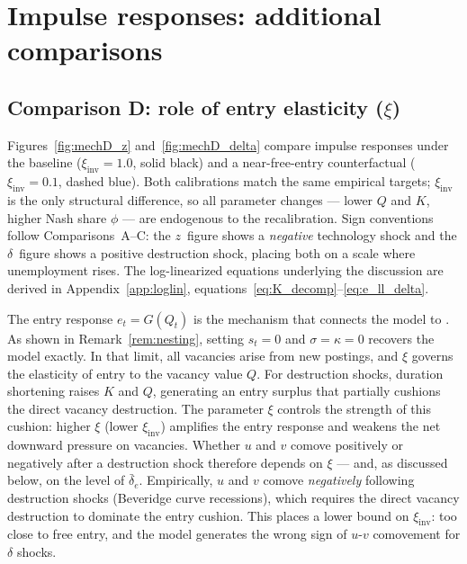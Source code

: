 \documentclass[authoryear, review, 12pt]{elsarticle}
\begin{document}
\section{Impulse responses: additional comparisons}
\label{app:additional_comparisons}

\subsection{Comparison D: role of entry elasticity ($\xi$)}
\label{app:comparison_D}

Figures~\ref{fig:mechD_z} and~\ref{fig:mechD_delta} compare impulse
responses under the baseline ($\xi_{\mathrm{inv}}=1.0$, solid black) and a
near-free-entry counterfactual ($\xi_{\mathrm{inv}}=0.1$, dashed blue).
Both calibrations match the same empirical targets; $\xi_{\mathrm{inv}}$
is the only structural difference, so all parameter changes --- lower $Q$
and $K$, higher Nash share $\phi$ --- are endogenous to the recalibration.
Sign conventions follow Comparisons~A--C: the $z$~figure shows a
\emph{negative} technology shock and the $\delta$~figure shows a positive
destruction shock, placing both on a scale where unemployment rises.
The log-linearized equations underlying the discussion are derived in
Appendix~\ref{app:loglin}, equations~\eqref{eq:K_decomp}--\eqref{eq:e_ll_delta}.

The entry response $e_t=G(Q_t)$ is the mechanism that connects the
model to \citet{coles_2018}.  As shown in
Remark~\ref{rem:nesting}, setting $s_t=0$ and $\sigma=\kappa=0$ recovers
the \citeauthor{coles_2018} model exactly.  In that limit, all vacancies
arise from new postings, and $\xi$ governs the elasticity of entry to the
vacancy value $Q$.  For destruction shocks, duration shortening raises $K$
and $Q$, generating an entry surplus that partially cushions the direct
vacancy destruction.  The parameter $\xi$ controls the strength of this
cushion: higher $\xi$ (lower $\xi_{\mathrm{inv}}$) amplifies the entry
response and weakens the net downward pressure on vacancies.
Whether $u$ and $v$ comove positively or negatively after a destruction
shock therefore depends on $\xi$ --- and, as discussed below, on the
level of $\bar\delta_e$.  Empirically, $u$ and $v$ comove
\emph{negatively} following destruction shocks (Beveridge curve
recessions), which requires the direct vacancy destruction to dominate
the entry cushion.  This places a lower bound on $\xi_{\mathrm{inv}}$:
too close to free entry, and the model generates the wrong sign of
$u$-$v$ comovement for $\delta$ shocks.
\end{document}
